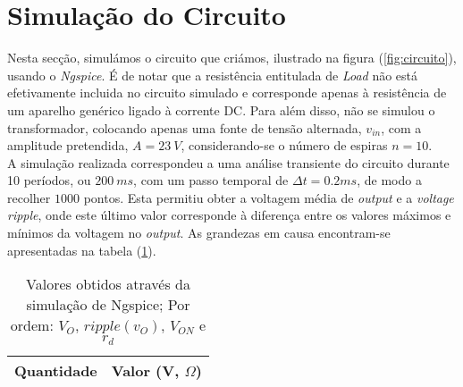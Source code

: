 \section{Simulação do Circuito}
\label{sec:simulation}

Nesta secção, simulámos o circuito que criámos, ilustrado na figura (\ref{fig:circuito}), usando o \emph{Ngspice}.
É de notar que a resistência entitulada de \emph{Load} não está efetivamente incluida no circuito simulado
e corresponde apenas à resistência de um aparelho genérico ligado à corrente DC. Para além disso, não se simulou o
transformador, colocando apenas uma fonte de tensão alternada, $v_{in}$, com a amplitude pretendida, $A = 23 \: V$,
considerando-se o número de espiras $n = 10$.
\\
A simulação realizada correspondeu a uma análise transiente do circuito durante 10 períodos, ou $200 \: ms$, com um
passo temporal de $\Delta t = 0.2 ms$, de modo a recolher $1000$ pontos. Esta permitiu
obter a voltagem média de \emph{output} e a \emph{voltage ripple}, onde este último valor corresponde à diferença entre os valores máximos
e mínimos da voltagem no \emph{output}. As grandezas em causa encontram-se apresentadas na tabela (\ref{tab:SimValues}).

\begin{table}[H]
    \centering
    \begin{tabular}{|l|r|}
    \hline    
    {\bf Quantidade} & {\bf Valor (V, $\Omega$)} \\ \hline
    
    \end{tabular}
    \caption{Valores obtidos através da simulação de Ngspice; Por ordem: $V_O$, $ripple(v_O)$, $V_{ON}$ e $r_d$}
    \label{tab:SimValues}
\end{table}


